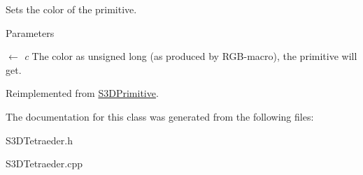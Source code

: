 Sets the color of the primitive. 


\begin{DoxyParams}{Parameters}
\item[\mbox{$\leftarrow$} {\em c}]The color as unsigned long (as produced by RGB-\/macro), the primitive will get. \end{DoxyParams}


Reimplemented from \hyperlink{class_s3_d_primitive_a1c8f036193987522bdfb6a49b9b74000}{S3DPrimitive}.



The documentation for this class was generated from the following files:\begin{DoxyCompactItemize}
\item 
S3DTetraeder.h\item 
S3DTetraeder.cpp\end{DoxyCompactItemize}
